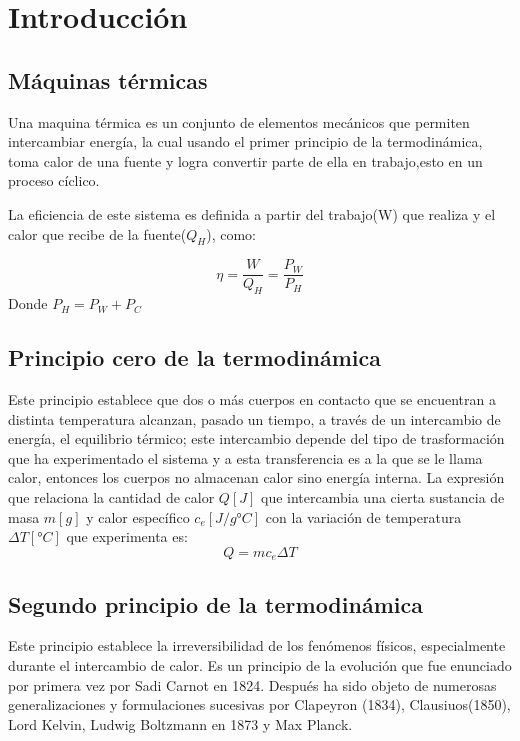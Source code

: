 \section{Introducción}
\subsection{Máquinas térmicas}
Una maquina térmica es un conjunto de elementos mecánicos que permiten intercambiar energía, la cual usando el primer principio de la termodinámica, toma calor de una fuente y logra convertir parte de ella en
trabajo,esto en un proceso cíclico.

La eﬁciencia de este sistema es deﬁnida a partir del trabajo(W) que realiza y el calor que recibe de la fuente($Q_H$), como:

\begin{equation}
    \eta = \frac{W}{Q_H}=\frac{P_W}{P_H}
\end{equation}
Donde $P_H=P_W+P_C$

\subsection{Principio cero de la termodinámica}
Este principio establece que dos o más cuerpos en contacto que se encuentran a distinta temperatura alcanzan, pasado un tiempo, a través de un intercambio de energía, el equilibrio térmico; este intercambio depende del tipo de trasformación que ha experimentado el sistema y a esta transferencia es a la que se le llama calor, entonces los cuerpos no almacenan calor sino energía interna. La expresión que relaciona la cantidad de calor $Q[J]$ que intercambia una cierta sustancia de masa $m[g]$ y calor especíﬁco $c_e[J/g°C]$ con la variación de temperatura $\Delta T[°C]$ que experimenta es:
\begin{equation}
    Q=mc_e\Delta T
\end{equation}

\subsection{Segundo principio de la termodinámica}
Este principio establece la irreversibilidad de los fenómenos físicos, especialmente durante el intercambio de calor. Es un principio de la evolución que fue enunciado por primera vez por Sadi Carnot en 1824. Después ha sido objeto de numerosas generalizaciones y formulaciones sucesivas por Clapeyron (1834), Clausiuos(1850), Lord Kelvin, Ludwig Boltzmann en 1873 y Max Planck.

